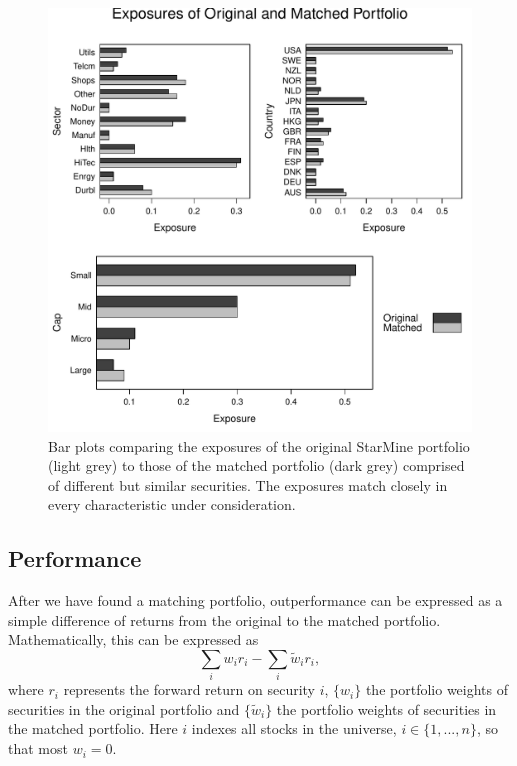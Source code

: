 \documentclass{article}\usepackage{graphicx, color}
\makeatletter
\def\maxwidth{ %
  \ifdim\Gin@nat@width>\linewidth
    \linewidth
  \else
    \Gin@nat@width
  \fi
}
\newenvironment{knitrout}{}{} %
\makeatother
\begin{document}
\begin{figure}
\begin{center}
\begin{knitrout}
\color{fgcolor}
\includegraphics[width=\maxwidth]{figure/unnamed-chunk-10} 

\end{knitrout}

\end{center}
\caption{Bar plots comparing the exposures of the original StarMine
  portfolio (light grey) to those of the matched portfolio (dark grey)
  comprised of different but similar securities. The exposures match
  closely in every characteristic under consideration.}
\label{FigurePortfolioMatchExposure}
\end{figure}

\subsection{Performance}




After we have found a matching portfolio, outperformance
can be expressed as a simple difference of returns from the original
to the matched portfolio. Mathematically, this can be expressed as
$$ \sum_i w_i r_i - \sum_i \tilde{w}_i r_i, $$
where $r_i$ represents the forward return on security $i$, $\{ w_i \}$
the portfolio weights of securities in the original portfolio and $\{
\tilde{w}_i \}$ the portfolio weights of securities in the matched
portfolio. Here $i$ indexes all stocks in the universe, $i \in \{1,
..., n\}$, so that most $w_i = 0$.
\end{document}
